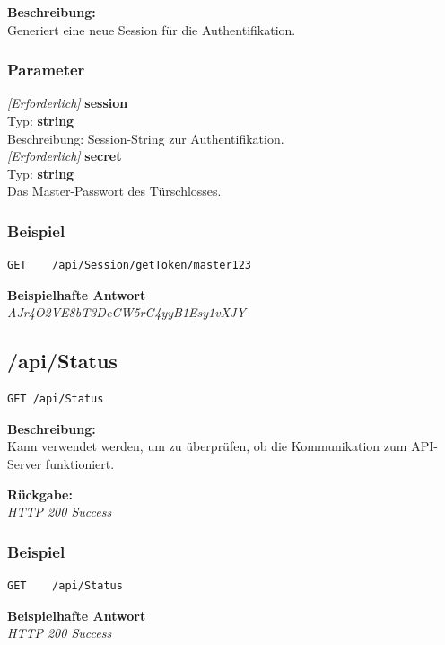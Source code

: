 \textbf{Beschreibung:} \\
Generiert eine neue Session für die Authentifikation.

\subsubsection{Parameter}
\textit{[Erforderlich]} \textbf{session} \\
Typ: \textbf{string} \\
Beschreibung: Session-String zur Authentifikation.\\

\textit{[Erforderlich]} \textbf{secret} \\
Typ: \textbf{string} \\
Das Master-Passwort des Türschlosses.

\subsubsection{Beispiel}
\begin{lstlisting}
GET    /api/Session/getToken/master123
\end{lstlisting}

\textbf{Beispielhafte Antwort} \\
\textit{AJr4O2VE8bT3DeCW5rG4yyB1Esy1vXJY}





\subsection{/api/Status}
\begin{lstlisting}
GET /api/Status
\end{lstlisting}

\textbf{Beschreibung:} \\
Kann verwendet werden, um zu überprüfen, ob die Kommunikation zum API-Server funktioniert.

\textbf{Rückgabe:} \\
\textit{HTTP 200 Success}

\subsubsection{Beispiel}
\begin{lstlisting}
GET    /api/Status
\end{lstlisting}

\textbf{Beispielhafte Antwort} \\
\textit{HTTP 200 Success}